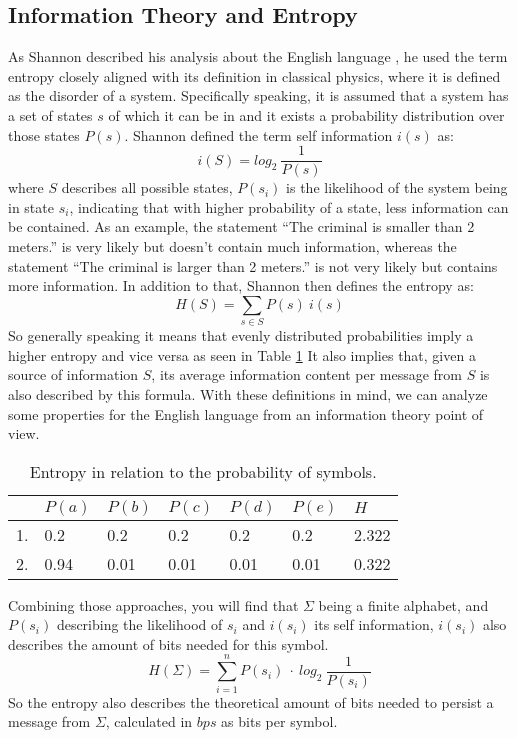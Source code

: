 \subsection{Information Theory and Entropy}
\par{
As Shannon described his analysis about the English language \cite{entropy}, he used the term entropy closely aligned with its definition in classical physics, where it is defined as the disorder of a system. Specifically speaking, it is assumed that a system has a set of states $s$ of which it can be in and it exists a probability distribution over those states $P(s)$. Shannon defined the term self information $i(s)$ as:
\[
i(S) = log_{2} \: \frac{1}{P(s)}
\]
where $S$ describes all possible states, $P(s_i)$ is the likelihood of the system being in state $s_i$, indicating that with higher probability of a state, less information can be contained. As an example, the statement \enquote{The criminal is smaller than 2 meters.} is very likely but doesn't contain much information, whereas the statement \enquote{The criminal is larger than 2 meters.} is not very likely but contains more information. In addition to that, Shannon then defines the entropy as:
\[
H(S) = \sum_{s \in S} P(s) \: i(s)
\]
 So generally speaking it means that evenly distributed probabilities imply a higher entropy and vice versa as seen in Table \ref{tab:t1:entropy} It also implies that, given a source of information $S$, its average information content per message from $S$ is also described by this formula. With these definitions in mind, we can analyze some properties for the English language from an information theory point of view.
 \begin{table}[h]
 	\centering
 	\begin{tabular}{l|l|l|l|l|l|l}
 		& $P(a)$ & $P(b)$ & $P(c)$ & $P(d)$ & $P(e)$ & $H$ \\
 		\hline
 		1. & 0.2 & 0.2 & 0.2 & 0.2 & 0.2 & 2.322 \\
 		2. & 0.94 & 0.01 & 0.01 & 0.01 & 0.01 & 0.322
 	\end{tabular}
  	\label{tab:t1:entropy}
 	\caption{Entropy in relation to the probability of symbols.}
 \end{table}
}

\par{
Combining those approaches, you will find that $\Sigma$ being a finite alphabet, and $P(s_i)$ describing the likelihood of $s_i$ and $i(s_i)$ its self information, $i(s_i)$ also describes the amount of bits needed for this symbol.
\[
	H(\Sigma) = \sum_{i = 1}^{n} P(s_i) \: \cdot \: log_{2} \: \frac{1}{P(s_i) }
\]
So the entropy 	also describes the theoretical amount of bits needed to persist a message from $\Sigma$, calculated in $bps$ as bits per symbol.
}
